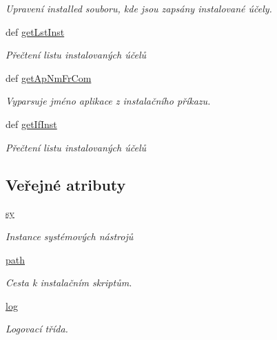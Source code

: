 \begin{DoxyCompactItemize}
\begin{DoxyCompactList}\small\item\em Upravení installed souboru, kde jsou zapsány instalované účely. \end{DoxyCompactList}\item 
def \hyperlink{classinFocus_1_1inFocus_af6094d372c354e903a9c9e12eed838e0}{get\-Lst\-Inst}
\begin{DoxyCompactList}\small\item\em Přečtení listu instalovaných účelů \end{DoxyCompactList}\item 
def \hyperlink{classinFocus_1_1inFocus_a7cdf0f46165d73f2474d2d856a79b8f1}{get\-Ap\-Nm\-Fr\-Com}
\begin{DoxyCompactList}\small\item\em Vyparsuje jméno aplikace z instalačního příkazu. \end{DoxyCompactList}\item 
def \hyperlink{classinFocus_1_1inFocus_aadfed74ffb6dc74f74fd2266dca70e0d}{get\-If\-Inst}
\begin{DoxyCompactList}\small\item\em Přečtení listu instalovaných účelů \end{DoxyCompactList}\end{DoxyCompactItemize}
\subsection*{Veřejné atributy}
\begin{DoxyCompactItemize}
\item 
\hypertarget{classinFocus_1_1inFocus_ae2b30d87560fa79d4676507a0edc476e}{\hyperlink{classinFocus_1_1inFocus_ae2b30d87560fa79d4676507a0edc476e}{sy}}\label{d3/d33/classinFocus_1_1inFocus_ae2b30d87560fa79d4676507a0edc476e}

\begin{DoxyCompactList}\small\item\em Instance systémových nástrojů \end{DoxyCompactList}\item 
\hypertarget{classinFocus_1_1inFocus_a49c854019791b3c216135e1ce7881aaa}{\hyperlink{classinFocus_1_1inFocus_a49c854019791b3c216135e1ce7881aaa}{path}}\label{d3/d33/classinFocus_1_1inFocus_a49c854019791b3c216135e1ce7881aaa}

\begin{DoxyCompactList}\small\item\em Cesta k instalačním skriptům. \end{DoxyCompactList}\item 
\hypertarget{classinFocus_1_1inFocus_a8f419c1bc959a1a56ff8fc522c7cf405}{\hyperlink{classinFocus_1_1inFocus_a8f419c1bc959a1a56ff8fc522c7cf405}{log}}\label{d3/d33/classinFocus_1_1inFocus_a8f419c1bc959a1a56ff8fc522c7cf405}

\begin{DoxyCompactList}\small\item\em Logovací třída. \end{DoxyCompactList}\end{DoxyCompactItemize}


